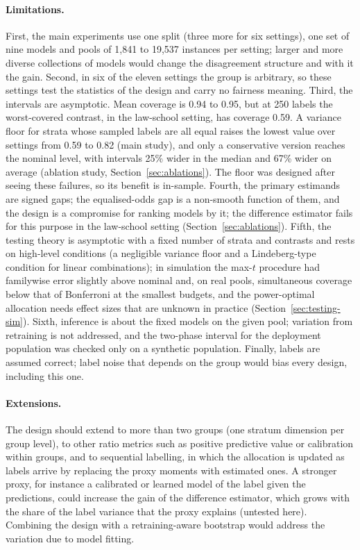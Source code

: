 \documentclass[pdflatex,sn-mathphys-num,iicol]{sn-jnl}
\theoremstyle{thmstyleone}
\theoremstyle{thmstyletwo}
\theoremstyle{thmstylethree}
\begin{document}
\paragraph{Limitations.} First, the main experiments use one split (three more for six settings), one set of nine models and pools of 1,841 to 19,537 instances per setting; larger and more diverse collections of models would change the disagreement structure and with it the gain. Second, in six of the eleven settings the group is arbitrary, so these settings test the statistics of the design and carry no fairness meaning. Third, the intervals are asymptotic. Mean coverage is 0.94 to 0.95, but at 250 labels the worst-covered contrast, in the law-school setting, has coverage 0.59. A variance floor for strata whose sampled labels are all equal raises the lowest value over settings from 0.59 to 0.82 (main study), and only a conservative version reaches the nominal level, with intervals 25\% wider in the median and 67\% wider on average (ablation study, Section~\ref{sec:ablations}). The floor was designed after seeing these failures, so its benefit is in-sample. Fourth, the primary estimands are signed gaps; the equalised-odds gap is a non-smooth function of them, and the design is a compromise for ranking models by it; the difference estimator fails for this purpose in the law-school setting (Section~\ref{sec:ablations}). Fifth, the testing theory is asymptotic with a fixed number of strata and contrasts and rests on high-level conditions (a negligible variance floor and a Lindeberg-type condition for linear combinations); in simulation the max-$t$ procedure had familywise error slightly above nominal and, on real pools, simultaneous coverage below that of Bonferroni at the smallest budgets, and the power-optimal allocation needs effect sizes that are unknown in practice (Section~\ref{sec:testing-sim}). Sixth, inference is about the fixed models on the given pool; variation from retraining is not addressed, and the two-phase interval for the deployment population was checked only on a synthetic population. Finally, labels are assumed correct; label noise that depends on the group would bias every design, including this one.

\paragraph{Extensions.} The design should extend to more than two groups (one stratum dimension per group level), to other ratio metrics such as positive predictive value or calibration within groups, and to sequential labelling, in which the allocation is updated as labels arrive by replacing the proxy moments with estimated ones. A stronger proxy, for instance a calibrated or learned model of the label given the predictions, could increase the gain of the difference estimator, which grows with the share of the label variance that the proxy explains (untested here). Combining the design with a retraining-aware bootstrap would address the variation due to model fitting.
\end{document}
